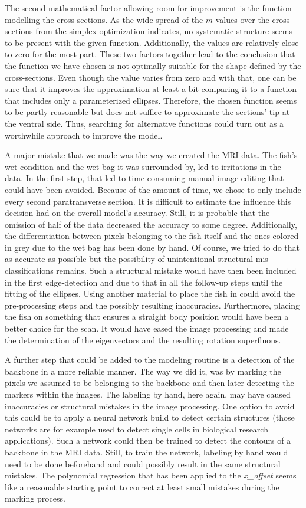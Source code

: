 The second mathematical factor allowing room for improvement is the function modelling the cross-sections. As the wide spread of the $m$-values over the cross-sections from the simplex optimization indicates, no systematic structure seems to be present with the given function. Additionally, the values are relatively close to zero for the most part. These two factors together lead to the conclusion that the function we have chosen is not optimally suitable for the shape defined by the cross-sections. Even though the value varies from zero and with that, one can be sure that it improves the approximation at least a bit comparing it to a function that includes only a parameterized ellipses. Therefore, the chosen function seems to be partly reasonable but does not suffice to approximate the sections' tip at the ventral side. Thus, searching for alternative functions could turn out as a worthwhile approach to improve the model.

A major mistake that we made was the way we created the MRI data. The fish's wet condition and the wet bag it was surrounded by, led to irritations in the data. In the first step, that led to time-consuming manual image editing that could have been avoided. Because of the amount of time, we chose to only include every second paratransverse section. It is difficult to estimate the influence this decision had on the overall model's accuracy. Still, it is probable that the omission of half of the data decreased the accuracy to some degree. Additionally, the differentiation between pixels belonging to the fish itself and the ones colored in grey due to the wet bag has been done by hand. Of course, we tried to do that as accurate as possible but the possibility of unintentional structural mis-classifications remains. Such a structural mistake would have then been included in the first edge-detection and due to that in all the follow-up steps until the fitting of the ellipses. Using another material to place the fish in could avoid the pre-processing steps and the possibly resulting inaccuracies. Furthermore, placing the fish on something that ensures a straight body position would have been a better choice for the scan. It would have eased the image processing and made the determination of the eigenvectors and the resulting rotation superfluous. 

A further step that could be added to the modeling routine is a detection of the backbone in a more reliable manner. The way we did it, was by marking the pixels we assumed to be belonging to the backbone and then later detecting the markers within the images. The labeling by hand, here again, may have caused inaccuracies or structural mistakes in the image processing. One option to avoid this could be to apply a neural network build to detect certain structures (those networks are for example used to detect single cells in biological research applications). Such a network could then be trained to detect the contours of a backbone in the MRI data. Still, to train the network, labeling by hand would need to be done beforehand and could possibly result in the same structural mistakes. The polynomial regression that has been applied to the \textit{x\_offset} seems like a reasonable starting point to correct at least small mistakes during the marking process.

